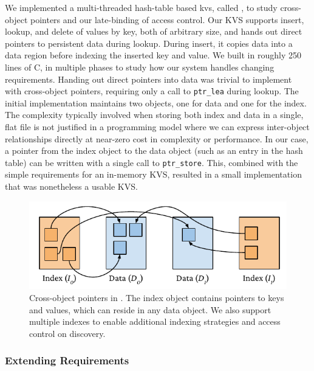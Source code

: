We implemented a multi-threaded hash-table based \ac{kvs}, called \nvkv, to
study cross-object pointers and our late-binding of access control.
Our KVS supports insert, lookup, and delete of values by key, both of arbitrary size, and hands
out direct pointers to persistent data during lookup. During insert, it copies data into a data
region before indexing the inserted key and value.
We built \nvkv in roughly 250 lines of C\@, in multiple phases to study how our system handles changing requirements. Handing
out direct pointers into data was trivial to implement with cross-object pointers, requiring
only a call to \texttt{ptr\_lea} during lookup. The initial implementation maintains two
objects, one for data and one for the index.  The complexity typically involved when storing both
index and data in a single, flat file is not justified in a programming
model where we can express inter-object relationships directly at
near-zero cost in complexity or performance. In our case, a pointer from the index object
to the data object (such as an entry in the hash table) can be written with a single call to
\texttt{ptr\_store}.
This, combined with the simple requirements for an in-memory \NVM KVS,
resulted in a small implementation that was nonetheless a
usable KVS.

\begin{figure}
    \centering
    \includegraphics[width=\linewidth]{fig/twzkv}
    \caption[Cross-object pointers]{Cross-object pointers in \nvkv. The index object contains pointers to keys and values,
        which can reside in any data object. We also support multiple indexes to enable additional
        indexing strategies and access control on discovery.}
    \label{fig:twzkv}
\end{figure}




\subsubsection{Extending Requirements}

